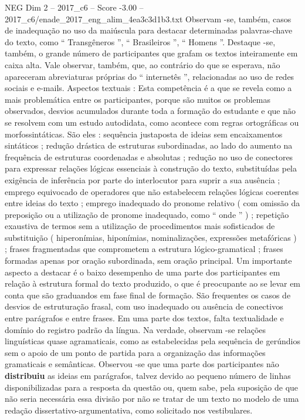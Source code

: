 \begin{textsample}{NEG Dim 2 – 2017\_c6 – Score -3.00 – 2017\_c6/enade\_2017\_eng\_alim\_4ea3c3d1b3.txt}
Observam -se, também, casos de inadequação no uso da maiúscula para destacar determinadas palavras-chave do texto, como “ Transgêneros ”, “ Brasileiros ”, “ Homens ”.
Destaque -se, também, o grande número de participantes que grafam os textos inteiramente em caixa alta.
Vale observar, também, que, ao contrário do que se esperava, não apareceram abreviaturas próprias do “ internetês ”, relacionadas ao uso de redes sociais e e-mails.
Aspectos textuais : Esta competência é a que se revela como a mais problemática entre os participantes, porque são muitos os problemas observados, desvios acumulados durante toda a formação do estudante e que não se resolvem com um estudo autodidata, como acontece com regras ortográficas ou morfossintáticas.
São eles : sequência justaposta de ideias sem encaixamentos sintáticos ; redução drástica de estruturas subordinadas, ao lado do aumento na frequência de estruturas coordenadas e absolutas ; redução no uso de conectores para expressar relações lógicas essenciais à construção do texto, substituídas pela exigência de inferência por parte do interlocutor para suprir a sua ausência ; emprego equivocado de operadores que não estabelecem relações lógicas coerentes entre ideias do texto ; emprego inadequado do pronome relativo ( com omissão da preposição ou a utilização de pronome inadequado, como “ onde ” ) ; repetição exaustiva de termos sem a utilização de procedimentos mais sofisticados de substituição ( hiperonímias, hiponímias, nominalizações, expressões metafóricas ) ; frases fragmentadas que comprometem a estrutura lógico-gramatical ; frases formadas apenas por oração subordinada, sem oração principal.
Um importante aspecto a destacar é o baixo desempenho de uma parte dos participantes em relação à estrutura formal do texto produzido, o que é preocupante ao se levar em conta que são graduandos em fase final de formação.
São frequentes os casos de desvios de estruturação frasal, com uso inadequado ou ausência de conectivos entre parágrafos e entre frases.
Em uma parte dos textos, falta textualidade e domínio do registro padrão da língua.
Na verdade, observam -se relações linguísticas quase agramaticais, como as estabelecidas pela sequência de gerúndios sem o apoio de um ponto de partida para a organização das informações gramaticais e semânticas.
Observou -se que uma parte dos participantes não \textbf{distribuiu} as ideias em parágrafos, talvez devido ao pequeno número de linhas disponibilizadas para a resposta da questão ou, quem sabe, pela suposição de que não seria necessária essa divisão por não se tratar de um texto no modelo de uma redação dissertativo-argumentativa, como solicitado nos vestibulares.

\end{textsample}
